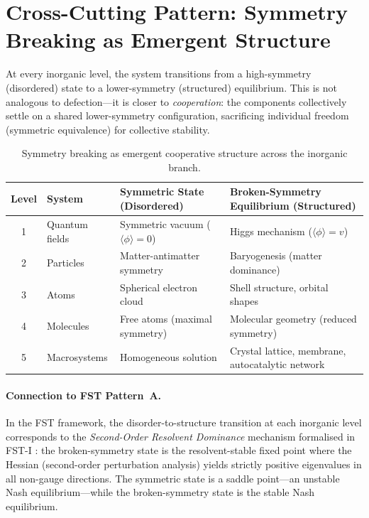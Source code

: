 \documentclass[12pt,a4paper]{article}
\theoremstyle{remark}
\begin{document}
\section{Cross-Cutting Pattern: Symmetry Breaking as Emergent Structure}
\label{sec:symmetry_breaking}

At every inorganic level, the system transitions from a high-symmetry (disordered) state to a lower-symmetry (structured) equilibrium. This is not analogous to defection---it is closer to \emph{cooperation}: the components collectively settle on a shared lower-symmetry configuration, sacrificing individual freedom (symmetric equivalence) for collective stability.

\begin{table}[htbp]
  \centering
  \caption{Symmetry breaking as emergent cooperative structure across the inorganic branch.}
  \label{tab:symmetry_breaking}
  \begin{tabularx}{\textwidth}{c l X X}
    \toprule
    \textbf{Level} & \textbf{System} & \textbf{Symmetric State (Disordered)} & \textbf{Broken-Symmetry Equilibrium (Structured)} \\
    \midrule
    1 & Quantum fields & Symmetric vacuum ($\langle\phi\rangle = 0$) & Higgs mechanism ($\langle\phi\rangle = v$) \\
    2 & Particles & Matter-antimatter symmetry & Baryogenesis (matter dominance) \\
    3 & Atoms & Spherical electron cloud & Shell structure, orbital shapes \\
    4 & Molecules & Free atoms (maximal symmetry) & Molecular geometry (reduced symmetry) \\
    5 & Macrosystems & Homogeneous solution & Crystal lattice, membrane, autocatalytic network \\
    \bottomrule
  \end{tabularx}
\end{table}

\paragraph{Connection to FST Pattern~A.}
In the FST framework, the disorder-to-structure transition at each inorganic level corresponds to the \emph{Second-Order Resolvent Dominance} mechanism formalised in FST-I \citep{Geiger2026a}: the broken-symmetry state is the resolvent-stable fixed point where the Hessian (second-order perturbation analysis) yields strictly positive eigenvalues in all non-gauge directions. The symmetric state is a saddle point---an unstable Nash equilibrium---while the broken-symmetry state is the stable Nash equilibrium.
\end{document}
